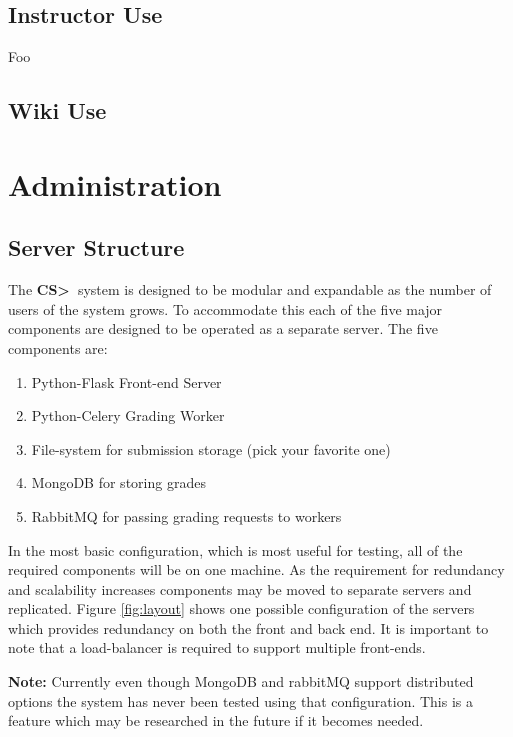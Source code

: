 \documentclass[11pt]{report}
\newcommand{\csgt}[0]{\textbf{CS\textgreater\ }}
\begin{document}
\pagebreak
\section{Instructor Use}
Foo

\section{Wiki Use}

\chapter{Administration}
\label{ch:admin}
\section{Server Structure}
The \csgt system is designed to be modular and expandable as the number of users of the system grows.
To accommodate this each of the five major components are designed to be operated as a separate server.
The five components are:

\begin{enumerate}
\item Python-Flask Front-end Server
\item Python-Celery Grading Worker
\item File-system for submission storage (pick your favorite one)
\item MongoDB for storing grades
\item RabbitMQ for passing grading requests to workers
\end{enumerate}

In the most basic configuration, which is most useful for testing, all of the required components will be
on one machine. As the requirement for redundancy and scalability increases components may be moved to
separate servers and replicated. Figure \ref{fig:layout} shows one possible configuration of the servers
which provides redundancy on both the front and back end. It is important to note that a load-balancer is
required to support multiple front-ends.

\textbf{Note:} Currently even though MongoDB and rabbitMQ support distributed options the system has never
been tested using that configuration. This is a feature which may be researched in the future if it becomes
needed.
\end{document}
